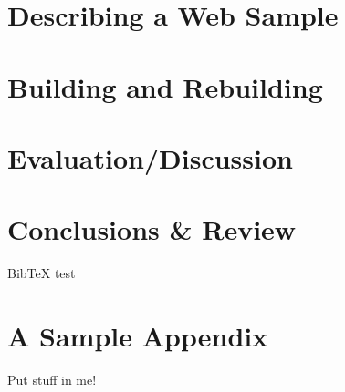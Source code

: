 \documentclass[11pt,oneside,a4paper,onecolumn,titlepage,draft]{lancsthesis}
\begin{document}
\chapter{Describing a Web Sample}



\chapter{Building and Rebuilding}


\chapter{Evaluation/Discussion}


\chapter{Conclusions \& Review}


BibTeX test \cite{Ahlberg94visualinformation}


\pagebreak

\backmatter



\pagebreak
\appendix
{}


\chapter{A Sample Appendix}
Put stuff in me!


\end{document}
